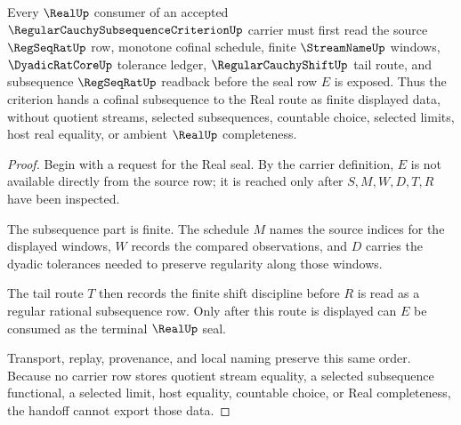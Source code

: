 \begin{theorem}
\label{thm:regular-cauchy-subsequence-criterion-real-seal-handoff}
Every $\RealUp$ consumer of an accepted $\RegularCauchySubsequenceCriterionUp$ carrier must first read the source $\RegSeqRatUp$ row, monotone cofinal schedule, finite $\StreamNameUp$ windows, $\DyadicRatCoreUp$ tolerance ledger, $\RegularCauchyShiftUp$ tail route, and subsequence $\RegSeqRatUp$ readback before the seal row $E$ is exposed. Thus the criterion hands a cofinal subsequence to the Real route as finite displayed data, without quotient streams, selected subsequences, countable choice, selected limits, host real equality, or ambient $\RealUp$ completeness.
\end{theorem}
\begin{proof}
Begin with a request for the Real seal. By the carrier definition, $E$ is not available directly from the source row; it is reached only after $S,M,W,D,T,R$ have been inspected.

The subsequence part is finite. The schedule $M$ names the source indices for the displayed windows, $W$ records the compared observations, and $D$ carries the dyadic tolerances needed to preserve regularity along those windows.

The tail route $T$ then records the finite shift discipline before $R$ is read as a regular rational subsequence row. Only after this route is displayed can $E$ be consumed as the terminal $\RealUp$ seal.

Transport, replay, provenance, and local naming preserve this same order. Because no carrier row stores quotient stream equality, a selected subsequence functional, a selected limit, host equality, countable choice, or Real completeness, the handoff cannot export those data.
\end{proof}

\begin{closurestatus}{\RegularCauchySubsequenceCriterionUp}
  \theoryclosure{\seedClosure}
  \formalstatus{\unformalizedV}
\end{closurestatus}
